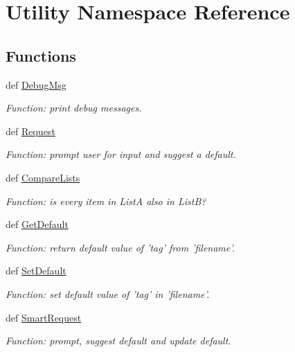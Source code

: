 \hypertarget{namespace_utility}{\section{\-Utility \-Namespace \-Reference}
\label{namespace_utility}
}
\subsection*{\-Functions}
\begin{DoxyCompactItemize}
\item 
def \hyperlink{namespace_utility_a263d1977dbf46288a8107129bb68db09}{\-Debug\-Msg}
\begin{DoxyCompactList}\small\item\em \-Function\-: print debug messages. \end{DoxyCompactList}\item 
def \hyperlink{namespace_utility_a8e57c519e77f078679da91c93c8d8f8a}{\-Request}
\begin{DoxyCompactList}\small\item\em \-Function\-: prompt user for input and suggest a default. \end{DoxyCompactList}\item 
def \hyperlink{namespace_utility_abddc763d76cf3ad7aabadd061bd509f6}{\-Compare\-Lists}
\begin{DoxyCompactList}\small\item\em \-Function\-: is every item in \-List\-A also in \-List\-B? \end{DoxyCompactList}\item 
def \hyperlink{namespace_utility_aaf996d87419a4cade91440d0c006e16f}{\-Get\-Default}
\begin{DoxyCompactList}\small\item\em \-Function\-: return default value of 'tag' from 'filename'. \end{DoxyCompactList}\item 
def \hyperlink{namespace_utility_a0becb5ce205b3ce07ca57f2e86217a21}{\-Set\-Default}
\begin{DoxyCompactList}\small\item\em \-Function\-: set default value of 'tag' in 'filename'. \end{DoxyCompactList}\item 
def \hyperlink{namespace_utility_a7272c03c260215b26d5b3d7ea6d68937}{\-Smart\-Request}
\begin{DoxyCompactList}\small\item\em \-Function\-: prompt, suggest default and update default. \end{DoxyCompactList}\end{DoxyCompactItemize}


